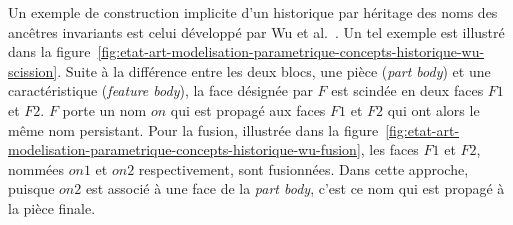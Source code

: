 Un exemple de construction implicite d'un historique par héritage des noms des
ancêtres invariants est celui développé par Wu et al.~\cite{wu2001face}. %
 Un tel exemple est illustré dans la
figure~\ref{fig:etat-art-modelisation-parametrique-concepts-historique-wu-scission}. %
Suite à la différence entre les deux blocs, une pièce (\textit{part body}) et
une caractéristique (\textit{feature body}), la face désignée par $F$ est
scindée en deux faces $F1$ et $F2$. %
$F$ porte un nom \(\mathit{on}\) qui est propagé aux faces $F1$ et $F2$ qui ont
alors le même nom persistant. %
Pour la fusion, illustrée dans la
figure~\ref{fig:etat-art-modelisation-parametrique-concepts-historique-wu-fusion},
les faces \(F1\) et \(F2\), nommées \(on1\) et \(on2\) respectivement, sont
fusionnées. %
Dans cette approche, puisque \(on2\) est associé à une face de la \textit{part
	body}, c'est ce nom qui est propagé  à
la pièce finale. %
%


